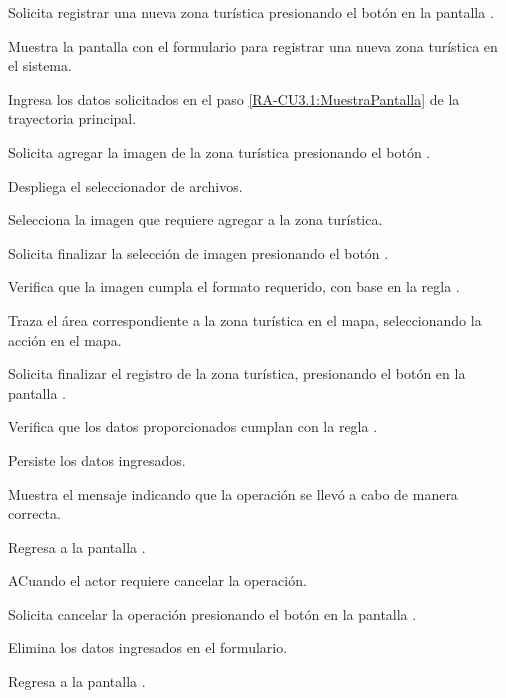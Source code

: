 	\begin{UCtrayectoria} 
		\UCpaso [\UCactor] Solicita registrar una nueva zona turística presionando el botón  en la pantalla .
		
		\UCpaso \label{RA-CU3.1:MuestraPantalla} Muestra la pantalla  con el formulario para registrar una nueva zona turística en el sistema.
		
		\UCpaso [\UCactor] \label{RA-CU3.1:IngresaDatos} Ingresa los datos solicitados en el paso \ref{RA-CU3.1:MuestraPantalla} de la trayectoria principal.
		
		\UCpaso [\UCactor] Solicita agregar la imagen de la zona turística presionando el botón .
		
		\UCpaso  Despliega el seleccionador de archivos.
		
		\UCpaso [\UCactor] \label{RA-CU3.1:SeleccionImagen} Selecciona la imagen que requiere agregar a la zona turística.
		
		\UCpaso [\UCactor] Solicita finalizar la selección de imagen presionando el botón .
		
		\UCpaso Verifica que la imagen cumpla el formato requerido, con base en la regla . 
		
		\UCpaso [\UCactor] Traza el área correspondiente a la zona turística en el mapa, seleccionando la acción \IUTrazar{} en el mapa.
		
		\UCpaso [\UCactor] Solicita finalizar el registro de la zona turística, presionando el botón  en la pantalla . 
		
		\UCpaso Verifica que los datos proporcionados cumplan con la regla . 
		
		\UCpaso Persiste los datos ingresados. 
		
		\UCpaso Muestra el mensaje  indicando que la operación se llevó a cabo de manera correcta.
		
		\UCpaso Regresa a la pantalla .
		
	\end{UCtrayectoria}

	\begin{UCtrayectoriaA}{A}{Cuando el actor requiere cancelar la operación.}
		
		\UCpaso [\UCactor] Solicita cancelar la operación presionando el botón  en la pantalla .
		
		\UCpaso Elimina los datos ingresados en el formulario.
		
		\UCpaso Regresa a la pantalla .
	\end{UCtrayectoriaA}


	
	